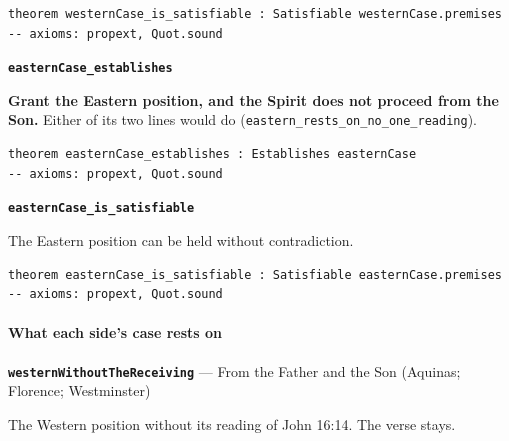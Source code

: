 \documentclass[11pt,paper=\testimonypaper,DIV=13,parskip=false]{scrartcl}
\begin{document}
{\small\begin{verbatim}
theorem westernCase_is_satisfiable : Satisfiable westernCase.premises
-- axioms: propext, Quot.sound
\end{verbatim}}
\par\medskip\noindent\textbf{\texttt{eastern\allowbreak{}Case\_\allowbreak{}establishes}}\par\nobreak\noindent
\textbf{Grant the Eastern position, and the Spirit does not proceed from the Son.} Either of its two lines would do (\texttt{eastern\_\allowbreak{}rests\_\allowbreak{}on\_\allowbreak{}no\_\allowbreak{}one\_\allowbreak{}reading}).

{\small\begin{verbatim}
theorem easternCase_establishes : Establishes easternCase
-- axioms: propext, Quot.sound
\end{verbatim}}
\par\medskip\noindent\textbf{\texttt{eastern\allowbreak{}Case\_\allowbreak{}is\_\allowbreak{}satisfiable}}\par\nobreak\noindent
The Eastern position can be held without contradiction.

{\small\begin{verbatim}
theorem easternCase_is_satisfiable : Satisfiable easternCase.premises
-- axioms: propext, Quot.sound
\end{verbatim}}
\paragraph*{What each side’s case rests on}
\leavevmode\par\nobreak
\par\medskip\noindent\textbf{\texttt{western\allowbreak{}Without\allowbreak{}The\allowbreak{}Receiving}} --- From the Father and the Son (Aquinas; Florence; Westminster)\par\nobreak\noindent
The Western position without its reading of John 16:14. The verse stays.
\end{document}
